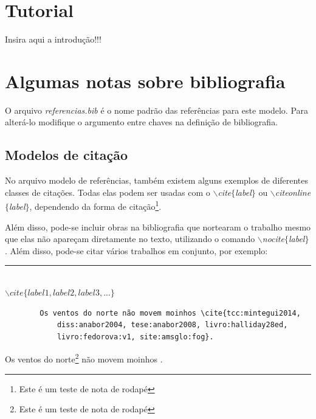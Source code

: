 \chapter{Tutorial}
	\par Insira aqui a introdução!!!
	
	\lipsum[1-5]
	
	
	
	\chapter{Algumas notas sobre bibliografia}
	
	
	\par O arquivo \textit{referencias.bib} é o nome padrão das referências para este modelo. Para alterá-lo modifique o argumento entre chaves na definição de bibliografia.
	
	
	\section{Modelos de citação}
	\par No arquivo modelo de referências, também existem alguns exemplos de diferentes classes de citações. Todas elas podem ser usadas com o \textit{$\backslash$cite$\{$label$\}$} ou \textit{$\backslash$citeonline$\{$label$\}$}, dependendo da forma de citação\footnote{Este é um teste de nota de rodapé}.
	
	\par Além disso, pode-se incluir obras na bibliografia que nortearam o trabalho mesmo que elas não apareçam diretamente no texto, utilizando o comando \textit{$\backslash$nocite$\{$label$\}$}. Além disso, pode-se citar vários trabalhos em conjunto, por exemplo:
	
	\begin{center}\rule{0.5\textwidth}{1pt}\\$\backslash cite\{label1,label2,label3,...\}$\end{center}
	
	\begin{verbatim}
		Os ventos do norte não movem moinhos \cite{tcc:mintegui2014, 
			diss:anabor2004, tese:anabor2008, livro:halliday28ed, 
			livro:fedorova:v1, site:amsglo:fog}.
	\end{verbatim}
	
	\par Os ventos do norte\footnote{Este é um teste de nota de rodapé} não movem moinhos \cite{tcc:mintegui2014,diss:anabor2004,tese:anabor2008,livro:halliday28ed,livro:fedorova:v1,site:amsglo:fog}.
	
